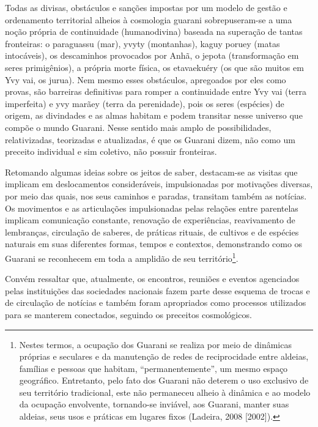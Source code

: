 Todas as divisas, obstáculos e sanções impostas por um modelo de gestão
e ordenamento territorial alheios à cosmologia guarani sobrepuseram-se
a uma noção própria de continuidade (humanodivina) baseada na superação
de tantas fronteiras: o paraguassu (mar), yvyty (montanhas), kaguy
poruey (matas intocáveis), os descaminhos provocados por Anhã, o jepota
(transformação em seres primigênios), a própria morte física, os
etavaekuéry (os que são muitos em Yvy vai, os jurua).  Nem mesmo esses
obstáculos, apregoados por eles como provas, são barreiras definitivas
para romper a continuidade entre Yvy vai (terra imperfeita) e yvy
marãey (terra da perenidade), pois os seres (espécies) de origem, as
divindades e as almas habitam e podem transitar nesse universo que
compõe o mundo Guarani. Nesse sentido mais amplo de possibilidades,
relativizadas, teorizadas e atualizadas, é que os Guarani dizem, não
como um preceito individual e sim coletivo, não possuir fronteiras. 

Retomando algumas ideias sobre os jeitos de saber, destacam-se as
visitas que implicam em deslocamentos consideráveis, impulsionadas por
motivações diversas, por meio das quais, nos seus caminhos e paradas,
transitam também as notícias. Os movimentos e as articulações
impulsionadas pelas relações entre parentelas implicam comunicação
constante, renovação de experiências, reavivamento de lembranças,
circulação de saberes, de práticas rituais, de cultivos e de espécies
naturais em suas diferentes formas, tempos e contextos, demonstrando
como os Guarani se reconhecem em toda a amplidão de seu
território\footnote{Nestes termos, a ocupação dos Guarani se realiza
por meio de dinâmicas próprias e seculares e da manutenção de redes de
reciprocidade entre aldeias, famílias e pessoas que habitam,
``permanentemente'', um mesmo espaço geográfico. Entretanto, pelo fato
dos Guarani não deterem o uso exclusivo de seu território tradicional,
este não permaneceu alheio à dinâmica e ao modelo da ocupação
envolvente, tornando-se inviável, aos Guarani, manter suas aldeias,
seus usos e práticas em lugares fixos (Ladeira, 2008 [2002]). }. 

Convém ressaltar que, atualmente, os encontros, reuniões e eventos
agenciados pelas instituições das sociedades nacionais fazem parte
desse esquema de trocas e de circulação de notícias e também foram
apropriados como processos utilizados para se manterem conectados,
seguindo os preceitos cosmológicos.

